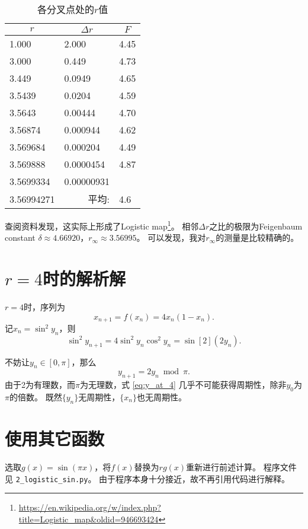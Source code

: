 \begin{table}
    \centering
    \caption{各分叉点处的$r$值}
    \label{tab:r_and_F}
    \begin{tabular}{lll}
    \toprule
    \multicolumn{1}{c}{$r$} & \multicolumn{1}{c}{$\Delta r$} & \multicolumn{1}{c}{$F$} \\ \midrule
    1.000 & 2.000 & 4.45 \\
    3.000 & 0.449 & 4.73 \\
    3.449 & 0.0949 & 4.65 \\
    3.5439 & 0.0204 & 4.59 \\
    3.5643 & 0.00444 & 4.70 \\
    3.56874 & 0.000944 & 4.62 \\
    3.569684 & 0.000204 & 4.49 \\
    3.569888 & 0.0000454 & 4.87 \\
    3.5699334 & 0.00000931 &  \\
    3.56994271 & \multicolumn{1}{r}{平均:}& 4.6 \\ \bottomrule
    \end{tabular}
\end{table}

查阅资料发现，这实际上形成了Logistic map\footnote{\url{https://en.wikipedia.org/w/index.php?title=Logistic_map&oldid=946693424}}。
相邻$\Delta r$之比的极限为Feigenbaum constant $\delta\approx 4.66920$，$r_\infty \approx 3.56995$。
可以发现，我对$r_\infty$的测量是比较精确的。

\section{\texorpdfstring{$r=4$}{r=4}时的解析解}
$r=4$时，序列为
\begin{equation}
    x_{n+1} = f(x_n) = 4x_n(1-x_n).
\end{equation}
记$x_n = \sin^2 y_n$，则
\begin{equation}
    \sin^2 y_{n+1} = 4\sin^2 y_n\cos^2 y_n = \sin[2](2y_n).
\end{equation}

不妨让$y_n \in [0, \pi]$，那么
\begin{equation}\label{eq:y_at_4}
    y_{n+1} = 2y_n \bmod \pi.
\end{equation}
由于2为有理数，而$\pi$为无理数，式 \eqref{eq:y_at_4} 几乎不可能获得周期性，除非$y_0$为$\pi$的倍数。
既然$\{y_n\}$无周期性，$\{x_n\}$也无周期性。

\section{使用其它函数}
选取$g(x) = \sin(\pi x)$，将$f(x)$替换为$rg(x)$重新进行前述计算。
程序文件见 \verb|2_logistic_sin.py|。
由于程序本身十分接近，故不再引用代码进行解释。

